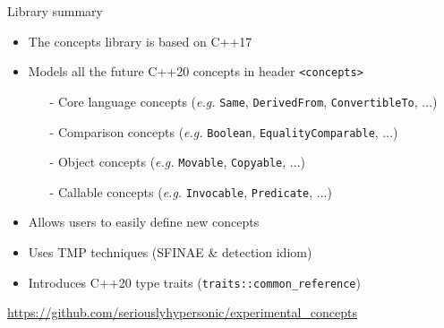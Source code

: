 \documentclass{beamer}
\newcommand{\code}[1]{{\scriptsize\texttt{#1}}}
\newcommand{\linkstyle}[1]{\textcolor{cyan}{\underline{#1}}}
\begin{document}
\begin{frame}{Library summary}
	\begin{itemize}
		\item The concepts library is based on C++17
		\item Models all the future C++20 concepts in header \code{<concepts>}
		\begin{itemize}
			\item[-] Core language concepts (\textit{e.g.} \code{Same}, \code{DerivedFrom}, \code{ConvertibleTo}, ...)
			\item[-] Comparison concepts (\textit{e.g.} \code{Boolean}, \code{EqualityComparable}, ...)
			\item[-] Object concepts (\textit{e.g.} \code{Movable}, \code{Copyable}, ...)
			\item[-] Callable concepts (\textit{e.g.} \code{Invocable}, \code{Predicate}, ...)
		\end{itemize}
		\item Allows users to easily define new concepts
		\item Uses TMP techniques (SFINAE \& detection idiom)
		\item Introduces C++20 type traits ({\code{traits::common\_reference}})
	\end{itemize}
	\vspace{7pt}
	\begin{center}
		\scriptsize
		\linkstyle{\url{https://github.com/seriouslyhypersonic/experimental_concepts}}
	\end{center}
\end{frame}
\end{document}

